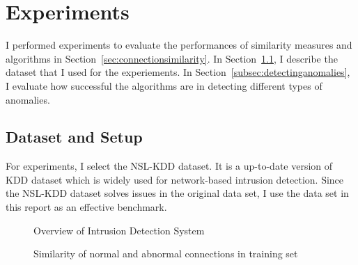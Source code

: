 \section{Experiments}
I performed experiments to evaluate the performances of similarity measures and algorithms in Section~\ref{sec:connectionsimilarity}.
\newline
In Section~\ref{subsec:datasetandsetup}, I describe the dataset that I used for the experiements.\newline
In Section~\ref{subsec:detectinganomalies}, I evaluate how successful the algorithms are in detecting different types of anomalies.

\subsection{Dataset and Setup}
\label{subsec:datasetandsetup}
For experiments, I select the NSL-KDD dataset. 
It is a up-to-date version of KDD dataset which is widely used for network-based intrusion detection. 
Since the NSL-KDD dataset solves issues in the original data set, I use the data set in this report as an effective benchmark. 

\begin{figure}[htb2]
\begin{center}
\end{center}
\caption{Overview of Intrusion Detection System}
\label{fig:refSingleRobot1}
\end{figure}

\begin{figure}[htb2]
\begin{center}
\end{center}
\caption{Similarity of normal and abnormal connections in training set} %
\label{fig:refSingleRobot1}
\end{figure}

